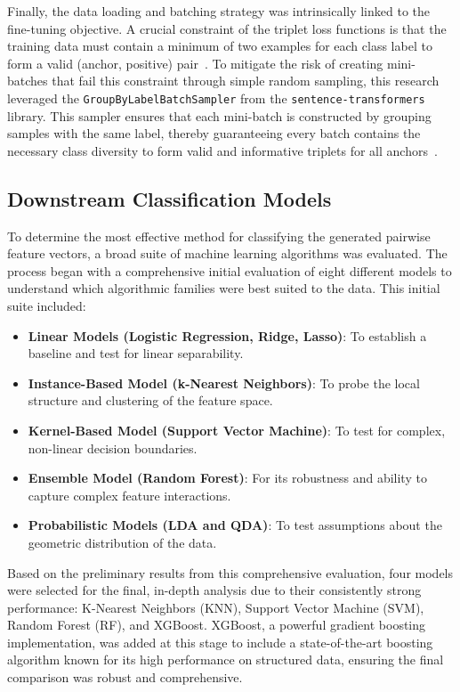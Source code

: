Finally, the data loading and batching strategy was intrinsically linked to the fine-tuning objective. A crucial constraint of the triplet loss functions is that the training data must contain a minimum of two examples for each class label to form a valid (anchor, positive) pair~\cite{sbertLosses}. To mitigate the risk of creating mini-batches that fail this constraint through simple random sampling, this research leveraged the \verb|GroupByLabelBatchSampler| from the \verb|sentence-transformers| library. This sampler ensures that each mini-batch is constructed by grouping samples with the same label, thereby guaranteeing every batch contains the necessary class diversity to form valid and informative triplets for all anchors~\cite{sbertSamplers}.

\subsection{Downstream Classification Models}\label{ch:3.3.2}
To determine the most effective method for classifying the generated pairwise feature vectors, a broad suite of machine learning algorithms was evaluated. The process began with a comprehensive initial evaluation of eight different models to understand which algorithmic families were best suited to the data. This initial suite included:
\begin{itemize}
    \item \textbf{Linear Models (Logistic Regression, Ridge, Lasso)}: To establish a baseline and test for linear separability.
    \item \textbf{Instance-Based Model (k-Nearest Neighbors)}: To probe the local structure and clustering of the feature space.
    \item \textbf{Kernel-Based Model (Support Vector Machine)}: To test for complex, non-linear decision boundaries.
    \item \textbf{Ensemble Model (Random Forest)}: For its robustness and ability to capture complex feature interactions.
    \item \textbf{Probabilistic Models (LDA and QDA)}: To test assumptions about the geometric distribution of the data.
\end{itemize}
Based on the preliminary results from this comprehensive evaluation, four models were selected for the final, in-depth analysis due to their consistently strong performance: K-Nearest Neighbors (KNN), Support Vector Machine (SVM), Random Forest (RF), and XGBoost. XGBoost, a powerful gradient boosting implementation, was added at this stage to include a state-of-the-art boosting algorithm known for its high performance on structured data, ensuring the final comparison was robust and comprehensive.

